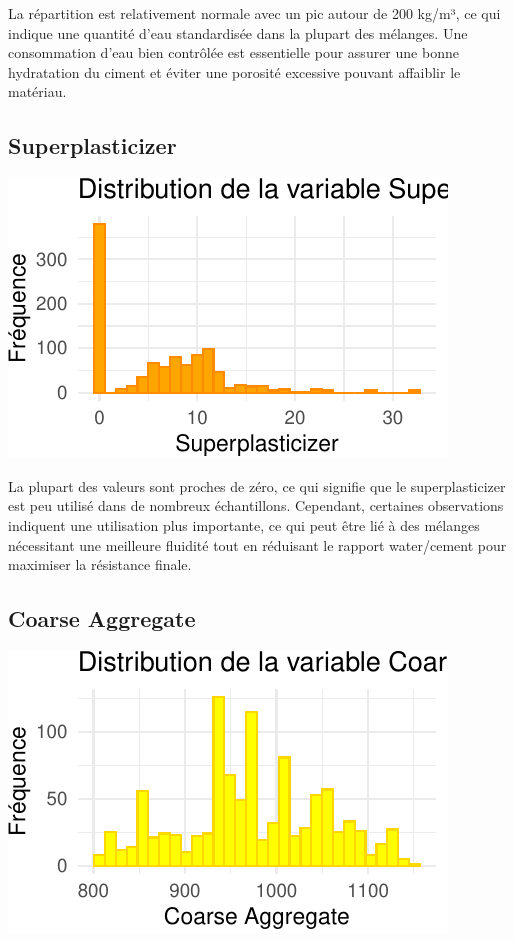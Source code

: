\documentclass[
  12pt,
]{article}
\begin{document}
La répartition est relativement normale avec un pic autour de 200 kg/m³,
ce qui indique une quantité d'eau standardisée dans la plupart des
mélanges. Une consommation d'eau bien contrôlée est essentielle pour
assurer une bonne hydratation du ciment et éviter une porosité excessive
pouvant affaiblir le matériau.

\subsection{Superplasticizer}\label{superplasticizer}

\begin{center}\includegraphics{rmd_final_files/figure-latex/unnamed-chunk-4-1} \end{center}

La plupart des valeurs sont proches de zéro, ce qui signifie que le
superplasticizer est peu utilisé dans de nombreux échantillons.
Cependant, certaines observations indiquent une utilisation plus
importante, ce qui peut être lié à des mélanges nécessitant une
meilleure fluidité tout en réduisant le rapport water/cement pour
maximiser la résistance finale.

\subsection{Coarse Aggregate}\label{coarse-aggregate}

\begin{center}\includegraphics{rmd_final_files/figure-latex/unnamed-chunk-5-1} \end{center}
\end{document}

